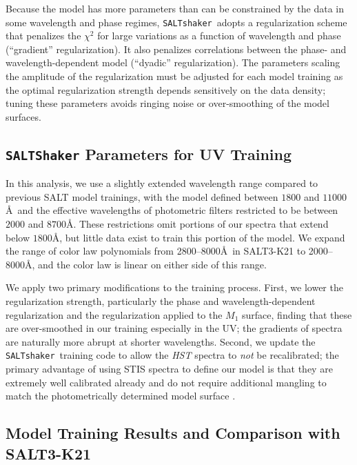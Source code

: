 \documentclass[twocolumn,tighten,times,floatfix]{aastex631}
\newcommand{\saltshaker}{\texttt{SALTshaker}}
\begin{document}
Because the model has more parameters than can be constrained by the data in some wavelength and phase regimes, \saltshaker\ adopts a regularization scheme that penalizes the $\chi^2$ for large variations as a function of wavelength and phase (``gradient'' regularization).  It also penalizes correlations between the phase- and wavelength-dependent model (``dyadic'' regularization).  The parameters scaling the amplitude of the regularization must be adjusted for each model training as the optimal regularization strength depends sensitively on the data density; tuning these parameters avoids ringing noise or over-smoothing of the model surfaces.




\subsection{{\tt SALTShaker} Parameters for UV Training}

In this analysis, we use a slightly extended wavelength range compared to previous SALT model trainings, with the model defined between $1800$ and $11000$\AA\ and the effective wavelengths of photometric filters restricted to be between $2000$ and $8700$\AA.  These restrictions omit portions of our spectra that extend below $1800$\AA, but little data exist to train this portion of the model. We expand the range of color law polynomials from 2800--8000\AA\ in SALT3-K21 to 2000--8000\AA, and the color law is linear on either side of this range.

We apply two primary modifications to the training process. 
First, we lower the regularization strength, particularly the phase and wavelength-dependent regularization and the regularization applied to the $M_1$ surface, finding that these are over-smoothed in our training especially in the UV; the gradients of spectra are naturally more abrupt at shorter wavelengths. Second, we update the \saltshaker\ training code to allow the {\it HST} spectra to {\it not} be recalibrated; the primary advantage of using STIS spectra to define our model is that they are extremely well calibrated already and do not require additional mangling to match the photometrically determined model surface \citep{Bohlin20, Bohlin20b}. 




\subsection{Model Training Results and Comparison with SALT3-K21}
\end{document}
